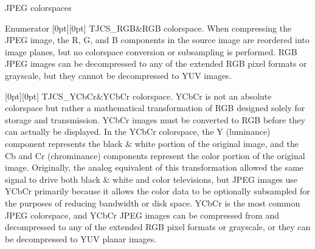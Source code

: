 J\+P\+EG colorspaces \begin{DoxyEnumFields}{Enumerator}
[0pt][0pt]{}\mbox{\label{group___turbo_j_p_e_g_gga4f83ad3368e0e29d1957be0efa7c3720a677cb7ccb85c4038ac41964a2e09e555}} 
T\+J\+C\+S\+\_\+\+R\+GB&R\+GB colorspace. When compressing the J\+P\+EG image, the R, G, and B components in the source image are reordered into image planes, but no colorspace conversion or subsampling is performed. R\+GB J\+P\+EG images can be decompressed to any of the extended R\+GB pixel formats or grayscale, but they cannot be decompressed to Y\+UV images. \\
\hline

[0pt][0pt]{}\mbox{\label{group___turbo_j_p_e_g_gga4f83ad3368e0e29d1957be0efa7c3720a7389b8f65bb387ffedce3efd0d78ec75}} 
T\+J\+C\+S\+\_\+\+Y\+Cb\+Cr&Y\+Cb\+Cr colorspace. Y\+Cb\+Cr is not an absolute colorspace but rather a mathematical transformation of R\+GB designed solely for storage and transmission. Y\+Cb\+Cr images must be converted to R\+GB before they can actually be displayed. In the Y\+Cb\+Cr colorspace, the Y (luminance) component represents the black \& white portion of the original image, and the Cb and Cr (chrominance) components represent the color portion of the original image. Originally, the analog equivalent of this transformation allowed the same signal to drive both black \& white and color televisions, but J\+P\+EG images use Y\+Cb\+Cr primarily because it allows the color data to be optionally subsampled for the purposes of reducing bandwidth or disk space. Y\+Cb\+Cr is the most common J\+P\+EG colorspace, and Y\+Cb\+Cr J\+P\+EG images can be compressed from and decompressed to any of the extended R\+GB pixel formats or grayscale, or they can be decompressed to Y\+UV planar images. \\
\hline


\end{DoxyEnumFields}
